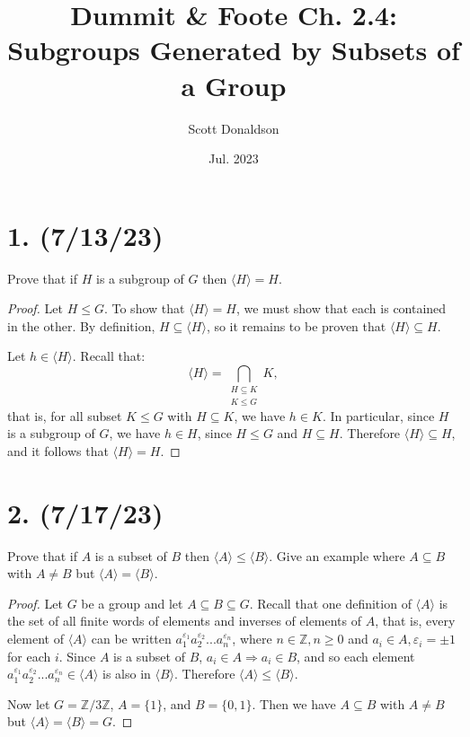 \documentclass{article}
\title{Dummit \& Foote Ch. 2.4: Subgroups Generated by Subsets of a Group}
\author{Scott Donaldson}
\date{Jul. 2023}
\begin{document}
\maketitle

\section*{1. (7/13/23)}

Prove that if $H$ is a subgroup of $G$ then $\langle H \rangle = H$.

\begin{proof}
    Let $H \leq G$. To show that $\langle H \rangle = H$, we must show that each is contained in the other. By definition, $H \subseteq \langle H \rangle$, so it remains to be proven that $\langle H \rangle \subseteq H$.

    Let $h \in \langle H \rangle$. Recall that:
    \begin{equation*}
        \langle H \rangle = \bigcap_{\substack{H \subseteq K \\ K \leq G}} K,
    \end{equation*}
    that is, for all subset $K \leq G$ with $H \subseteq K$, we have $h \in K$. In particular, since $H$ is a subgroup of $G$, we have $h \in H$, since $H \leq G$ and $H \subseteq H$. Therefore $\langle H \rangle \subseteq H$, and it follows that $\langle H \rangle = H$.
\end{proof}

\section*{2. (7/17/23)}

Prove that if $A$ is a subset of $B$ then $\langle A \rangle \leq \langle B \rangle$. Give an example where $A \subseteq B$ with $A \neq B$ but $\langle A \rangle = \langle B \rangle$.

\begin{proof}
    Let $G$ be a group and let $A \subseteq B \subseteq G$. Recall that one definition of $\langle A \rangle$ is the set of all finite words of elements and inverses of elements of $A$, that is, every element of $\langle A \rangle$ can be written $a_1^{\varepsilon_1} a_2^{\varepsilon_2} ... a_n^{\varepsilon_n}$, where $n \in \mathbb{Z}, n \geq 0$ and $a_i \in A, \varepsilon_i = \pm 1$ for each $i$. Since $A$ is a subset of $B$, $a_i \in A \Rightarrow a_i \in B$, and so each element $a_1^{\varepsilon_1} a_2^{\varepsilon_2} ... a_n^{\varepsilon_n} \in \langle A \rangle$ is also in $\langle B \rangle$. Therefore $\langle A \rangle \leq \langle B \rangle$.

    Now let $G = \mathbb{Z}/3\mathbb{Z}$, $A = \{ 1 \}$, and $B = \{ 0, 1 \}$. Then we have $A \subseteq B$ with $A \neq B$ but $\langle A \rangle = \langle B \rangle = G$.
\end{proof}
\end{document}
